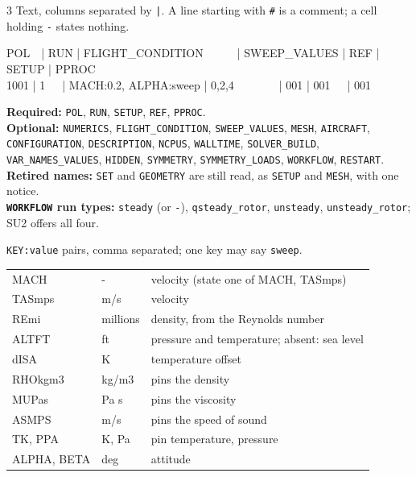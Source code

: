 \begin{multicols}{3}
\columnbreak
{}
Text, columns separated by \texttt{|}. A line starting with \texttt{\#} is a comment; a cell holding \texttt{-} states nothing.\par\vspace{2pt}
{\ttfamily\fontsize{6.6}{7.8}\selectfont
POL\ \ | RUN | FLIGHT\_CONDITION\ \ \ \ \ \ | SWEEP\_VALUES | REF | SETUP | PPROC\\
1001 | 1\ \ \ | MACH:0.2, ALPHA:sweep | 0,2,4\ \ \ \ \ \ \ \ | 001 | 001\ \ \ | 001\par}
\vspace{2pt}
\textbf{Required:} \texttt{POL}, \texttt{RUN}, \texttt{SETUP}, \texttt{REF}, \texttt{PPROC}.\\
\textbf{Optional:} \texttt{NUMERICS}, \texttt{FLIGHT\_CONDITION}, \texttt{SWEEP\_VALUES}, \texttt{MESH}, \texttt{AIRCRAFT}, \texttt{CONFIGURATION}, \texttt{DESCRIPTION}, \texttt{NCPUS}, \texttt{WALLTIME}, \texttt{SOLVER\_BUILD}, \texttt{VAR\_NAMES\_VALUES}, \texttt{HIDDEN}, \texttt{SYMMETRY}, \texttt{SYMMETRY\_LOADS}, \texttt{WORKFLOW}, \texttt{RESTART}.\\
\textbf{Retired names:} \texttt{SET} and \texttt{GEOMETRY} are still read, as \texttt{SETUP} and \texttt{MESH}, with one notice.\\
\textbf{\texttt{WORKFLOW} run types:} \texttt{steady} (or \texttt{-}), \texttt{qsteady\_rotor}, \texttt{unsteady}, \texttt{unsteady\_rotor}; SU2 offers all four.

\texttt{KEY:value} pairs, comma separated; one key may say \texttt{sweep}.\par\vspace{1pt}
\begin{tabular}{@{}>{\ttfamily}p{15mm}p{13mm}p{52mm}@{}}
MACH & - & velocity (state one of MACH, TASmps)\\
TASmps & m/s & velocity\\
REmi & millions & density, from the Reynolds number\\
ALTFT & ft & pressure and temperature; absent: sea level\\
dISA & K & temperature offset\\
RHOkgm3 & kg/m3 & pins the density\\
MUPas & Pa s & pins the viscosity\\
ASMPS & m/s & pins the speed of sound\\
TK, PPA & K, Pa & pin temperature, pressure\\
ALPHA, BETA & deg & attitude\\
\end{tabular}


\end{multicols}
